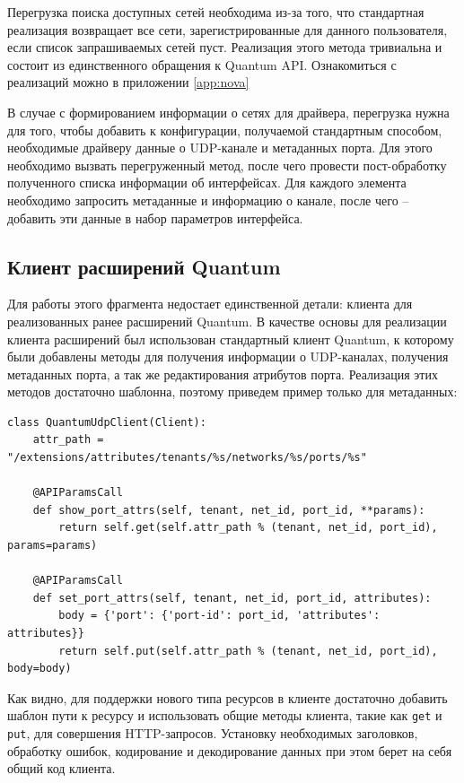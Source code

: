 Перегрузка поиска доступных сетей необходима из-за того, что стандартная реализация 
возвращает все сети, зарегистрированные для данного пользователя, если список запрашиваемых
сетей пуст. Реализация этого метода тривиальна и состоит из единственного обращения к 
Quantum API. Ознакомиться с реализаций можно в приложении \ref{app:nova}

В случае с формированием информации о сетях для драйвера, перегрузка нужна для того, чтобы
добавить к конфигурации, получаемой стандартным способом, необходимые драйверу
данные о UDP-канале и метаданных порта. Для этого необходимо вызвать перегруженный метод,
после чего провести пост-обработку полученного списка информации об интерфейсах. 
Для каждого элемента необходимо запросить метаданные и информацию о канале, после чего -- 
добавить эти данные в набор параметров интерфейса.

\subsection{Клиент расширений Quantum}
Для работы этого фрагмента недостает единственной детали: клиента для реализованных
ранее расширений Quantum. В качестве основы для реализации клиента расширений был использован 
стандартный клиент Quantum, к которому были добавлены методы для получения информации
о UDP-каналах, получения метаданных порта, а так же редактирования атрибутов порта.
Реализация этих методов достаточно шаблонна, поэтому приведем пример только для метаданных:
\begin{lstlisting}
class QuantumUdpClient(Client):
    attr_path = "/extensions/attributes/tenants/%s/networks/%s/ports/%s"

    @APIParamsCall
    def show_port_attrs(self, tenant, net_id, port_id, **params):
        return self.get(self.attr_path % (tenant, net_id, port_id), params=params)

    @APIParamsCall
    def set_port_attrs(self, tenant, net_id, port_id, attributes):
        body = {'port': {'port-id': port_id, 'attributes': attributes}}
        return self.put(self.attr_path % (tenant, net_id, port_id),  body=body)
\end{lstlisting}
Как видно, для поддержки нового типа ресурсов в клиенте достаточно добавить шаблон
пути к ресурсу и использовать общие методы клиента, такие как \verb`get` и \verb`put`,
для совершения HTTP-запросов. Установку необходимых заголовков, обработку ошибок,
кодирование и декодирование данных при этом берет на себя общий код клиента.

